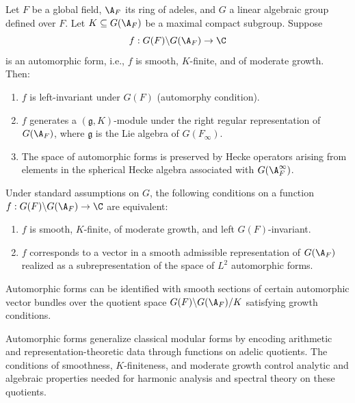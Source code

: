 

\begin{theorem}
    Let $F$ be a global field, $\A_F$ its ring of adeles, and $G$ a linear algebraic group defined over $F$. Let $K \subseteq G(\A_F)$ be a maximal compact subgroup. Suppose 
    $$
    f : G(F) \backslash G(\A_F) \to \C
    $$
    is an automorphic form, i.e., $f$ is smooth, $K$-finite, and of moderate growth. Then:
    \begin{enumerate}
        \item $f$ is left-invariant under $G(F)$ (automorphy condition).
        \item $f$ generates a $(\mathfrak{g}, K)$-module under the right regular representation of $G(\A_F)$, where $\mathfrak{g}$ is the Lie algebra of $G(F_\infty)$.
        \item The space of automorphic forms is preserved by Hecke operators arising from elements in the spherical Hecke algebra associated with $G(\A_F^{\infty})$.
    \end{enumerate}
\end{theorem}

\begin{proposition}
Under standard assumptions on $G$, the following conditions on a function $f: G(F) \backslash G(\A_F) \to \C$ are equivalent:
\begin{enumerate}
    \item $f$ is smooth, $K$-finite, of moderate growth, and left $G(F)$-invariant.
    \item $f$ corresponds to a vector in a smooth admissible representation of $G(\A_F)$ realized as a subrepresentation of the space of $L^2$ automorphic forms.
\end{enumerate}
\end{proposition}

\begin{corollary}
Automorphic forms can be identified with smooth sections of certain automorphic vector bundles over the quotient space $G(F)\backslash G(\A_F)/K$ satisfying growth conditions.
\end{corollary}

\begin{remark}[Intuition]
Automorphic forms generalize classical modular forms by encoding arithmetic and representation-theoretic data through functions on adelic quotients. The conditions of smoothness, $K$-finiteness, and moderate growth control analytic and algebraic properties needed for harmonic analysis and spectral theory on these quotients.
\end{remark}



